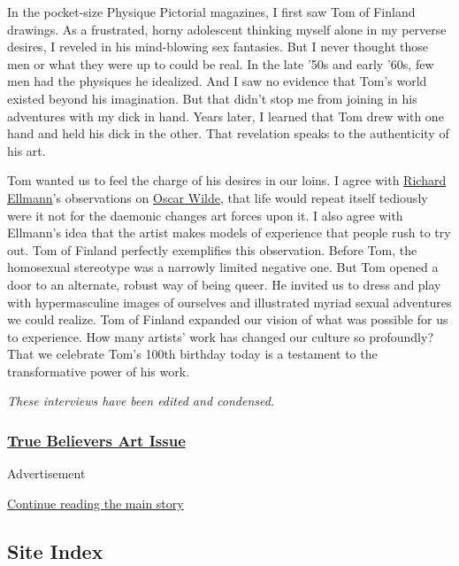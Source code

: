 In the pocket-size Physique Pictorial magazines, I first saw Tom of
Finland drawings. As a frustrated, horny adolescent thinking myself
alone in my perverse desires, I reveled in his mind-blowing sex
fantasies. But I never thought those men or what they were up to could
be real. In the late '50s and early '60s, few men had the physiques he
idealized. And I saw no evidence that Tom's world existed beyond his
imagination. But that didn't stop me from joining in his adventures with
my dick in hand. Years later, I learned that Tom drew with one hand and
held his dick in the other. That revelation speaks to the authenticity
of his art.

Tom wanted us to feel the charge of his desires in our loins. I agree
with
\href{https://www.nytimes3xbfgragh.onion/1987/05/14/obituaries/richard-ellmann-dies-at-69-eminent-james-joyce-scholar.html}{Richard
Ellmann}'s observations on
\href{https://www.nytimes3xbfgragh.onion/2018/10/02/t-magazine/oscar-wilde-temple-london.html}{Oscar
Wilde}, that life would repeat itself tediously were it not for the
daemonic changes art forces upon it. I also agree with Ellmann's idea
that the artist makes models of experience that people rush to try out.
Tom of Finland perfectly exemplifies this observation. Before Tom, the
homosexual stereotype was a narrowly limited negative one. But Tom
opened a door to an alternate, robust way of being queer. He invited us
to dress and play with hypermasculine images of ourselves and
illustrated myriad sexual adventures we could realize. Tom of Finland
expanded our vision of what was possible for us to experience. How many
artists' work has changed our culture so profoundly? That we celebrate
Tom's 100th birthday today is a testament to the transformative power of
his work.

\emph{These interviews have been edited and condensed.}

\hypertarget{true-believers-art-issue}{%
\subsubsection{\texorpdfstring{\href{https://www.nytimes3xbfgragh.onion/issue/t-magazine/2020/07/02/true-believers-art-issue}{True
Believers Art
Issue}}{True Believers Art Issue}}\label{true-believers-art-issue}}

Advertisement

\protect\hyperlink{after-bottom}{Continue reading the main story}

\hypertarget{site-index}{%
\subsection{Site Index}\label{site-index}}

